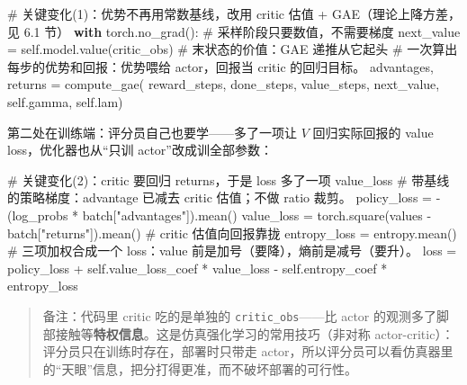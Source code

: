 \documentclass[
  chinese,
]{ctexart}
\newenvironment{Shaded}{\begin{snugshade}}{\end{snugshade}}
\newcommand{\CommentTok}[1]{\textcolor[rgb]{0.37,0.37,0.37}{#1}}
\newcommand{\ControlFlowTok}[1]{\textcolor[rgb]{0.00,0.23,0.31}{\textbf{#1}}}
\newcommand{\NormalTok}[1]{\textcolor[rgb]{0.00,0.23,0.31}{#1}}
\newcommand{\OperatorTok}[1]{\textcolor[rgb]{0.37,0.37,0.37}{#1}}
\newcommand{\StringTok}[1]{\textcolor[rgb]{0.13,0.47,0.30}{#1}}
\newcommand{\VariableTok}[1]{\textcolor[rgb]{0.07,0.07,0.07}{#1}}
\begin{document}
\begin{Shaded}
\begin{Highlighting}[]
\CommentTok{\# 关键变化(1)：优势不再用常数基线，改用 critic 估值 + GAE（理论上降方差，见 6.1 节）}
        \ControlFlowTok{with}\NormalTok{ torch.no\_grad():    }\CommentTok{\# 采样阶段只要数值，不需要梯度}
\NormalTok{            next\_value }\OperatorTok{=} \VariableTok{self}\NormalTok{.model.value(critic\_obs)    }\CommentTok{\# 末状态的价值：GAE 递推从它起头}
        \CommentTok{\# 一次算出每步的优势和回报：优势喂给 actor，回报当 critic 的回归目标。}
\NormalTok{        advantages, returns }\OperatorTok{=}\NormalTok{ compute\_gae(}
\NormalTok{            reward\_steps, done\_steps, value\_steps, next\_value, }\VariableTok{self}\NormalTok{.gamma, }\VariableTok{self}\NormalTok{.lam)}
\end{Highlighting}
\end{Shaded}

第二处在训练端：评分员自己也要学------多了一项让 \(V\) 回归实际回报的
value loss，优化器也从``只训 actor''改成训全部参数：

\begin{Shaded}
\begin{Highlighting}[]
\CommentTok{\# 关键变化(2)：critic 要回归 returns，于是 loss 多了一项 value\_loss}
        \CommentTok{\# 带基线的策略梯度：advantage 已减去 critic 估值；不做 ratio 裁剪。}
\NormalTok{        policy\_loss }\OperatorTok{=} \OperatorTok{{-}}\NormalTok{(log\_probs }\OperatorTok{*}\NormalTok{ batch[}\StringTok{"advantages"}\NormalTok{]).mean()}
\NormalTok{        value\_loss }\OperatorTok{=}\NormalTok{ torch.square(values }\OperatorTok{{-}}\NormalTok{ batch[}\StringTok{"returns"}\NormalTok{]).mean()    }\CommentTok{\# critic 估值向回报靠拢}
\NormalTok{        entropy\_loss }\OperatorTok{=}\NormalTok{ entropy.mean()}
        \CommentTok{\# 三项加权合成一个 loss：value 前是加号（要降），熵前是减号（要升）。}
\NormalTok{        loss }\OperatorTok{=}\NormalTok{ policy\_loss }\OperatorTok{+} \VariableTok{self}\NormalTok{.value\_loss\_coef }\OperatorTok{*}\NormalTok{ value\_loss }\OperatorTok{{-}} \VariableTok{self}\NormalTok{.entropy\_coef }\OperatorTok{*}\NormalTok{ entropy\_loss}
\end{Highlighting}
\end{Shaded}

\begin{quote}
备注：代码里 critic 吃的是单独的 \texttt{critic\_obs}------比 actor
的观测多了脚部接触等\textbf{特权信息}。这是仿真强化学习的常用技巧（非对称
actor-critic）：评分员只在训练时存在，部署时只带走
actor，所以评分员可以看仿真器里的``天眼''信息，把分打得更准，而不破坏部署的可行性。
\end{quote}
\end{document}
